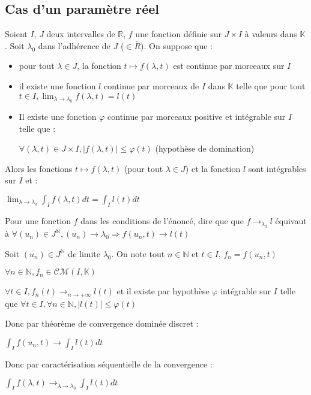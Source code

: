 \documentclass[a4paper,12pt]{book}
\newcommand{\Thr}[2]{\begin{tcolorbox}[sharp corners, colback=white,colframe=red!90!black!75, title=Théorème : #1]#2\end{tcolorbox}}
\newcommand{\Pre}[1]{\begin{tcolorbox}[sharp corners, colback=white,colframe=green!60!green!30!black!75, title=Preuve]#1\end{tcolorbox}}
\def\R{\mathbb{R}}
\def\N{\mathbb{N}}
\def\K{\mathbb{K}}
\begin{document}
\subsection{Cas d'un paramètre réel}
\Thr{échange des limites non-discrètes}{Soient $I$, $J$ deux intervalles de $\R$, $f$ une fonction définie sur $J\times I$ à valeurs dans $\K$. Soit $\lambda_0$ dans l'adhérence de $J$ ($\in\bar{R}$). On suppose que :\begin{itemize}
\item pour tout $\lambda\in J$, la fonction $t\mapsto f(\lambda,t)$ est continue par morceaux sur $I$
\item il existe une fonction $l$ continue par morceaux de $I$ dans $\K$ telle que pour tout $t\in I, \lim_{\lambda\to \lambda_0}f(\lambda,t)=l(t)$
\item Il existe une fonction $\varphi$ continue par morceaux positive et intégrable sur $I$ telle que : \par \begin{center}$\forall (\lambda, t)\in J\times I, \vert f(\lambda, t)\vert\leq\varphi(t)$ (hypothèse de domination) \end{center}
\end{itemize}
Alors les fonctions $t\mapsto f(\lambda, t)$ (pour tout $\lambda\in J$) et la fonction $l$ sont intégrables sur $I$ et : \par \begin{center}$\lim_{\lambda\to\lambda_0}\int_If(\lambda, t)dt = \int_I l(t)dt$ \end{center}}
\Pre{Pour une fonction $f$ dans les conditions de l'énoncé, dire que que $f\to_{\lambda_0}l$ équivaut à $\forall (u_n)\in J^\N, (u_n)\to \lambda_0 \Rightarrow f(u_n, t)\to l(t)$
\par Soit $(u_n)\in J^\N$ de limite $\lambda_0$. On note  tout $n\in\N$ et $t\in I$, $f_n = f(u_n,t)$ \par $\forall n\in\N, f_n\in\mathcal{CM}(I, \K)$ \par $\forall t\in I, f_n(t)\to_{n\to+\infty} l(t)$ et il existe par hypothèse $\varphi$ intégrable sur $I$ telle que $\forall t\in I, \forall n\in\N, \vert l(t)\vert\leq \varphi(t)$ \par Donc par théorème de convergence dominée discret : \par \begin{center} $\int_I f(u_n,t)\to\int_Il(t)dt$\end{center}
\par Donc par caractérisation séquentielle de la convergence : \par \begin{center} $\int_If(\lambda, t)\to_{\lambda\to\lambda_0}\int_Il(t)dt$\end{center}}
\end{document}
